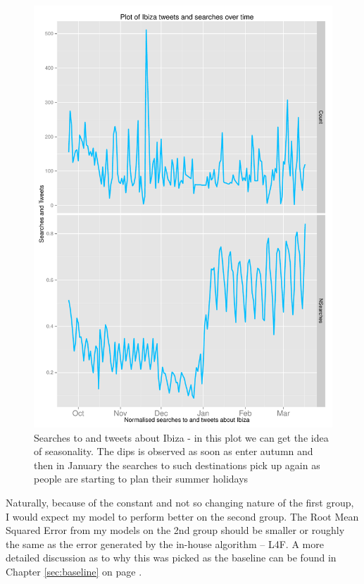 \documentclass[minf,twoside,singlespacing,parskip,frontabs,notimes,11pt]{infthesis}
\begin{document}
\begin{figure}[]
\begin{center}
\includegraphics[scale=0.7]{ibiza-searches}
\end{center}
\caption{Searches to and tweets about Ibiza - in this plot we can get the idea of seasonality. The dips is observed as soon as enter autumn and then in January the searches to such destinations pick up again as people are starting to plan their summer holidays}
\label{ibiza-searches}
\end{figure}

Naturally, because of the constant and not so changing nature of the first group, I would expect my model to perform better on the second group. The Root Mean Squared Error from my models on the 2nd group should be smaller or roughly the same as the error generated by the in-house algorithm -- L4F. A more detailed discussion as to why this was picked as the baseline can be found in Chapter \ref{sec:baseline} on page \pageref{sec:baseline}.
\end{document}
